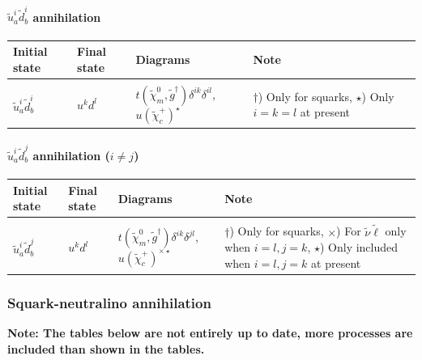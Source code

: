 \documentclass[a4paper,10pt,oneside]{book}
\newcommand{\tabspace}{\\[-2.5ex]}
\begin{document}
\paragraph{$\tilde{u}_a^i \tilde{d}_{b}^{i}$ annihilation}

\begin{center}
\begin{tabular}{llll} \hline
{\bfseries Initial state} & {\bfseries Final state} &
{\bfseries Diagrams} & {\bfseries Note} \\ \hline \tabspace
$\tilde{u}^i_a \tilde{d}^{i}_b$ & $u^k d^l$ &
$t(\tilde{\chi}_m^0,\tilde{g}^\dagger)\delta^{ik}\delta^{il}$, $u(\tilde{\chi}_c^+)^\star$ 
& \parbox[t]{4cm}{$\dagger$) Only for squarks, $\star$) Only $i=k=l$ at present} \\ \hline
\end{tabular}
\end{center}

\paragraph{$\tilde{u}_a^i \tilde{d}_{b}^{j}$ annihilation ($i \ne j$)}

\begin{center}
\begin{tabular}{llll} \hline
{\bfseries Initial state} & {\bfseries Final state} &
{\bfseries Diagrams} & {\bfseries Note} \\ \hline \tabspace
$\tilde{u}^i_a \tilde{d}^{j}_b$ & $u^k d^l$ &
$t(\tilde{\chi}_m^0,\tilde{g}^\dagger)\delta^{ik}\delta^{jl}$, $u(\tilde{\chi}_c^+)^{\times\star}$ 
& \parbox[t]{4cm}{$\dagger$) Only for squarks, $\times$) For $\tilde{\nu}\tilde{\ell}$ only when $i=l,j=k$,
$\star$) Only included when $i=l,j=k$ at present} \\ \hline
\end{tabular}
\end{center}


\subsubsection{Squark-neutralino annihilation}

{\bfseries Note: The tables below are not entirely up to date, more processes are included
than shown in the tables.}
\end{document}
